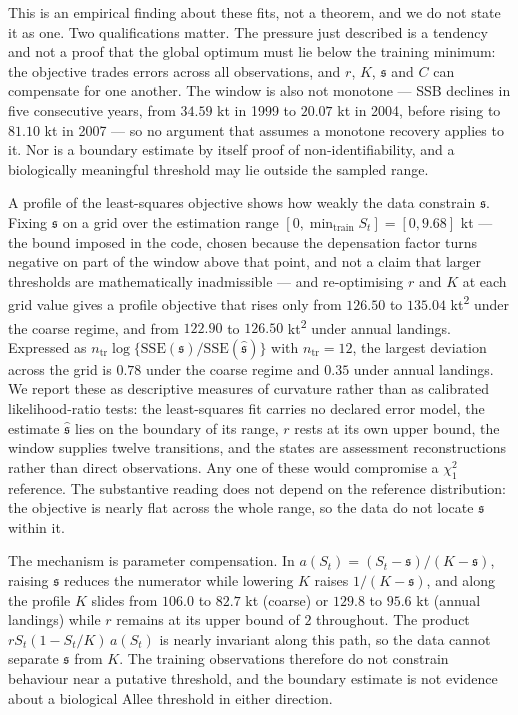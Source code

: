 \documentclass[11pt]{article}
\begin{document}
This is an empirical finding about these fits, not a theorem, and we do
not state it as one. Two qualifications matter. The pressure just
described is a tendency and not a proof that the global optimum must lie
below the training minimum: the objective trades errors across all
observations, and \(r\), \(K\), \(\mathfrak s\) and \(C\) can compensate
for one another. The window is also not monotone --- SSB declines in
five consecutive years, from \(34.59\) kt in 1999 to \(20.07\) kt in
2004, before rising to \(81.10\) kt in 2007 --- so no argument that
assumes a monotone recovery applies to it. Nor is a boundary estimate by
itself proof of non-identifiability, and a biologically meaningful
threshold may lie outside the sampled range.

A profile of the least-squares objective shows how weakly the data
constrain \(\mathfrak s\). Fixing \(\mathfrak s\) on a grid over the
estimation range \([0, \min_{\mathrm{train}} S_t] = [0, 9.68]\) kt ---
the bound imposed in the code, chosen because the depensation factor
turns negative on part of the window above that point, and not a claim
that larger thresholds are mathematically inadmissible --- and
re-optimising \(r\) and \(K\) at each grid value gives a profile
objective that rises only from \(126.50\) to \(135.04\)
kt\textsuperscript{2} under the coarse regime, and from \(122.90\) to
\(126.50\) kt\textsuperscript{2} under annual landings. Expressed as
\(n_{\mathrm{tr}}\log\{\mathrm{SSE}(\mathfrak s)/
\mathrm{SSE}(\hat{\mathfrak s})\}\) with \(n_{\mathrm{tr}}=12\), the
largest deviation across the grid is \(0.78\) under the coarse regime
and \(0.35\) under annual landings. We report these as descriptive
measures of curvature rather than as calibrated likelihood-ratio tests:
the least-squares fit carries no declared error model, the estimate
\(\hat{\mathfrak s}\) lies on the boundary of its range, \(r\) rests
at its own upper bound, the window supplies twelve transitions, and the
states are assessment reconstructions rather than direct observations.
Any one of these would compromise a \(\chi^2_1\) reference. The
substantive reading does not depend on the reference distribution: the
objective is nearly flat across the whole range, so the data do not
locate \(\mathfrak s\) within it.

The mechanism is parameter compensation. In
\(a(S_t)=(S_t-\mathfrak s)/(K-\mathfrak s)\), raising \(\mathfrak s\)
reduces the numerator while lowering \(K\) raises \(1/(K-\mathfrak s)\),
and along the profile \(K\) slides from \(106.0\) to \(82.7\) kt
(coarse) or \(129.8\) to \(95.6\) kt (annual landings) while \(r\)
remains at its upper bound of \(2\) throughout. The product
\(rS_t(1-S_t/K)\,a(S_t)\) is nearly invariant along this path, so the
data cannot separate \(\mathfrak s\) from \(K\). The training
observations therefore do not constrain behaviour near a putative
threshold, and the boundary estimate is not evidence about a biological
Allee threshold in either direction.
\end{document}
